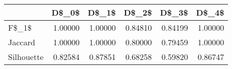 \begin{table}
\centering
\caption{}
\label{}
\begin{tabular}{lrrrrr}
\toprule
{} &   D\$\_0\$ &   D\$\_1\$ &   D\$\_2\$ &   D\$\_3\$ &   D\$\_4\$ \\
\midrule
F\$\_1\$      & 1.00000 & 1.00000 & 0.84810 & 0.84199 & 1.00000 \\
Jaccard    & 1.00000 & 1.00000 & 0.80000 & 0.79459 & 1.00000 \\
Silhouette & 0.82584 & 0.87851 & 0.68258 & 0.59820 & 0.86747 \\
\bottomrule
\end{tabular}
\end{table}

